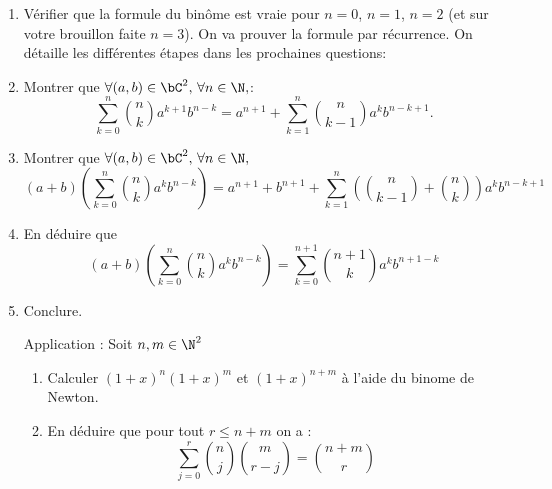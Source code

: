 \begin{exercice}


\begin{enumerate}
\item Vérifier que la formule du binôme est vraie pour $n=0$, $n=1$, $n=2$ (et sur votre brouillon faite $n=3$).
On va prouver la formule par récurrence. On détaille les différentes étapes dans les prochaines questions: 
\item Montrer que $\forall (a,b)\in \bC^2,\,  \forall n \in \N, $:
$$\sum_{k=0}^n \binom{n}{k}a^{k+1} b^{n-k} = a^{n+1}+\sum_{k=1}^{n} \binom{n}{k-1}a^{k} b^{n-k+1}.$$


\item Montrer que $\forall (a,b)\in \bC^2,\,  \forall n \in \N, $
$$(a+b)\left( \sum_{k=0}^n \binom{n}{k}a^k b^{n-k}\right) = a^{n+1}+b^{n+1}+\sum_{k=1}^{n} \left( \binom{n}{k-1}+\binom{n}{k}\right)a^{k} b^{n-k+1}$$

\item En déduire que 
$$(a+b)\left( \sum_{k=0}^n \binom{n}{k}a^k b^{n-k}\right) = \sum_{k=0}^{n+1}  \binom{n+1}{k}a^{k} b^{n+1-k}$$

\item Conclure. 

Application : 
Soit $n,m\in \N^2$ 
\begin{enumerate}
\item Calculer $(1+x)^n(1+x)^m$  et $(1+x)^{n+m}$ à l'aide du binome de Newton. 
\item En déduire que pour tout $r\leq n+m$ on a : 
$$\sum_{j=0}^r  \binom{n}{j} \binom{m}{r-j}=\binom{n+m}{r}$$
\end{enumerate}


\end{enumerate}




\end{exercice}




